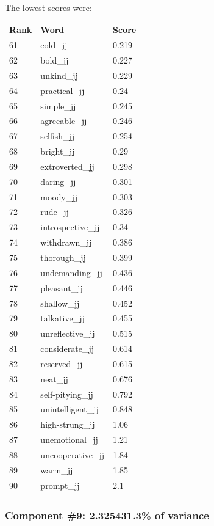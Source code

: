 \documentclass[10pt,letterpaper]{book}
\begin{document}
The lowest scores were:
\begin{tabular}{ l l l }
        \textbf{Rank} & \textbf{Word} & \textbf{Score} \\
        61 & cold\_jj & 0.219 \\
        62 & bold\_jj & 0.227 \\
        63 & unkind\_jj & 0.229 \\
        64 & practical\_jj & 0.24 \\
        65 & simple\_jj & 0.245 \\
        66 & agreeable\_jj & 0.246 \\
        67 & selfish\_jj & 0.254 \\
        68 & bright\_jj & 0.29 \\
        69 & extroverted\_jj & 0.298 \\
        70 & daring\_jj & 0.301 \\
        71 & moody\_jj & 0.303 \\
        72 & rude\_jj & 0.326 \\
        73 & introspective\_jj & 0.34 \\
        74 & withdrawn\_jj & 0.386 \\
        75 & thorough\_jj & 0.399 \\
        76 & undemanding\_jj & 0.436 \\
        77 & pleasant\_jj & 0.446 \\
        78 & shallow\_jj & 0.452 \\
        79 & talkative\_jj & 0.455 \\
        80 & unreflective\_jj & 0.515 \\
        81 & considerate\_jj & 0.614 \\
        82 & reserved\_jj & 0.615 \\
        83 & neat\_jj & 0.676 \\
        84 & self-pitying\_jj & 0.792 \\
        85 & unintelligent\_jj & 0.848 \\
        86 & high-strung\_jj & 1.06 \\
        87 & unemotional\_jj & 1.21 \\
        88 & uncooperative\_jj & 1.84 \\
        89 & warm\_jj & 1.85 \\
        90 & prompt\_jj & 2.1 \\
\end{tabular}
\subsubsection{Component \#9: 2.325431.3\% of variance}
\end{document}
